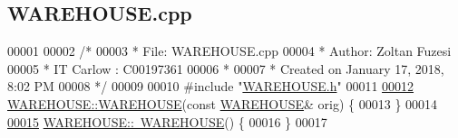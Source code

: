 \hypertarget{_w_a_r_e_h_o_u_s_e_8cpp_source}{}\subsection{W\+A\+R\+E\+H\+O\+U\+S\+E.\+cpp}

\begin{DoxyCode}
00001 
00002 \textcolor{comment}{/* }
00003 \textcolor{comment}{ * File:   WAREHOUSE.cpp}
00004 \textcolor{comment}{ * Author: Zoltan Fuzesi}
00005 \textcolor{comment}{ * IT Carlow : C00197361}
00006 \textcolor{comment}{ *}
00007 \textcolor{comment}{ * Created on January 17, 2018, 8:02 PM}
00008 \textcolor{comment}{ */}
00009 
00010 \textcolor{preprocessor}{#include "\hyperlink{_w_a_r_e_h_o_u_s_e_8h}{WAREHOUSE.h}"}
00011 
\hypertarget{_w_a_r_e_h_o_u_s_e_8cpp_source.tex_l00012}{}\hyperlink{class_w_a_r_e_h_o_u_s_e_a4782d251d2203377f8e9f331ba3b0a7e}{00012} \hyperlink{class_w_a_r_e_h_o_u_s_e_a7a924d389af91f54ed0e1d1d8d56ec57}{WAREHOUSE::WAREHOUSE}(\textcolor{keyword}{const} \hyperlink{class_w_a_r_e_h_o_u_s_e}{WAREHOUSE}& orig) \{
00013 \}
00014 
\hypertarget{_w_a_r_e_h_o_u_s_e_8cpp_source.tex_l00015}{}\hyperlink{class_w_a_r_e_h_o_u_s_e_ad5aa686839d7be9bfea33d469c58086b}{00015} \hyperlink{class_w_a_r_e_h_o_u_s_e_ad5aa686839d7be9bfea33d469c58086b}{WAREHOUSE::~WAREHOUSE}() \{
00016 \}
00017 
\end{DoxyCode}
